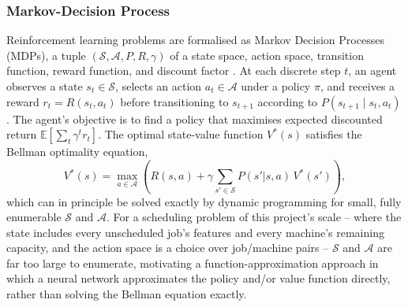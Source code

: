 \documentclass[12pt]{article}
\begin{document}
\subsubsection{Markov-Decision Process}
Reinforcement learning problems are formalised as Markov Decision Processes (MDPs), a tuple $(\mathcal{S}, \mathcal{A}, P, R, \gamma)$ of a state space, action space, transition function, reward function, and discount factor \cite{DRL_Intrusion}. At each discrete step $t$, an agent observes a state $s_t \in \mathcal{S}$, selects an action $a_t \in \mathcal{A}$ under a policy $\pi$, and receives a reward $r_t = R(s_t, a_t)$ before transitioning to $s_{t+1}$ according to $P(s_{t+1}\mid s_t, a_t)$. The agent's objective is to find a policy that maximises expected discounted return $\mathbb{E}\left[\sum_t \gamma^t r_t\right]$. The optimal state-value function $V^{*}(s)$ satisfies the Bellman optimality equation,
\begin{equation}
      V^{*}(s) = \max_{a \in \mathcal{A}} \left( R(s,a) + \gamma \sum_{s'
  \in \mathcal{S}} P(s'|s,a)\,V^{*}(s') \right),
\end{equation}
which can in principle be solved exactly by dynamic programming for small, fully enumerable $\mathcal{S}$ and $\mathcal{A}$. For a scheduling problem of this project's scale -- where the state includes every unscheduled job's features and every machine's remaining capacity, and the action space is a choice over job/machine pairs -- $\mathcal{S}$ and $\mathcal{A}$ are far too large to enumerate, motivating a function-approximation approach in which a neural network approximates the policy and/or value function directly, rather than solving the Bellman equation exactly.
\end{document}

